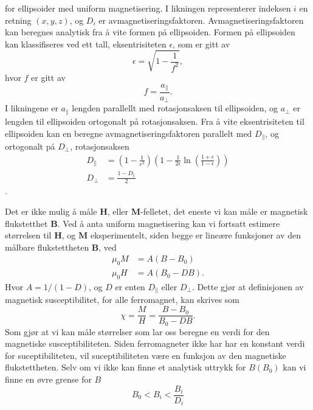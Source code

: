 \documentclass[%
 reprint,
 amsmath,amssymb,
 aps,
]{revtex4-1}
\begin{document}
for ellipsoider med uniform magnetisering. I likningen representerer indeksen $i$ en retning $(x, y, z)$, og $D_i$ er avmagnetiseringsfaktoren. Avmagnetiseringsfaktoren kan beregnes analytisk fra å vite formen på ellipsoiden. Formen på ellipsoiden kan klassifiseres ved ett tall, eksentrisiteten $\epsilon$, som er gitt av
\begin{equation}
  \epsilon = \sqrt{1-\frac{1}{f^2}},\label{eksent}
\end{equation}
hvor $f$ er gitt av
\begin{equation}
  f = \frac{a_{\parallel}}{a_{\perp}}.
\end{equation}
I likningene er $a_{\parallel}$ lengden parallellt med rotasjonsaksen til ellipsoiden, og $a_{\perp}$ er lengden til ellipsoiden ortogonalt på rotasjonsaksen. Fra å vite eksentrisiteten til ellipsoiden kan en beregne avmagnetiseringsfaktoren parallelt med $D_{\parallel}$, og ortogonalt på $D_{\perp}$, rotasjonsaksen
\begin{align}
  D_{\parallel} &= \left(1-\frac{1}{\epsilon^2}\right)\left(1-\frac{1}{2\epsilon}\ln{\left(\frac{1+\epsilon}{1-\epsilon}\right)} \right) \\
  D_{\perp} &= \frac{1-D_{\parallel}}{2}
\end{align}.
\par
Det er ikke mulig å måle $\bm{H}$, eller $\bm{M}$-felletet, det eneste vi kan måle er magnetisk flukstetthet $\bm{B}$. Ved å anta uniform magnetisering kan vi fortsatt estimere størrelsen til $\bm{H}$, og $\bm{M}$ eksperimentelt, siden begge er lineære funksjoner av den målbare flukstettheten $\bm{B}$, ved
\begin{align}
  \mu_0 M &= A\left(B-B_0\right) \\
  \mu_0 H &= A\left(B_0 - DB\right).
\end{align}
Hvor $A=1/(1-D)$, og $D$ er enten $D_{\parallel}$ eller $D_{\perp}$. Dette gjør at definisjonen av magnetisk susceptibilitet, for alle ferromagnet, kan skrives som
\begin{equation}
  \chi = \frac{M}{H} = \frac{B-B_0}{B_0-DB}.
\end{equation}
Som gjør at vi kan måle størrelser som lar oss beregne en verdi for den magnetiske susceptibiliteten. Siden ferromagneter ikke har har en konstant verdi for suceptibiliteten, vil suceptibiliteten være en funksjon av den magnetiske flukstettheten. Selv om vi ikke kan finne et analytisk uttrykk for $B(B_0)$ kan vi finne en øvre grense for $B$
\begin{equation}
  B_0 < B_i < \frac{B_i}{D_i} \label{upper_limit}
\end{equation}
\end{document}
